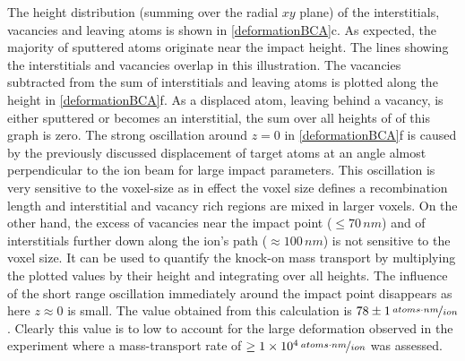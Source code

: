 The height distribution (summing over the radial $xy$ plane) of the interstitials, vacancies and leaving atoms is shown in \ref{deformationBCA}c. As expected, the majority of sputtered atoms originate near the impact height. The lines showing the interstitials and vacancies overlap in this illustration. The vacancies subtracted from the sum of interstitials and leaving atoms is plotted along the height in \ref{deformationBCA}f. As a displaced atom, leaving behind a vacancy, is either sputtered or becomes an interstitial, the sum over all heights of of this graph is zero. The strong oscillation around $z=0$ in \ref{deformationBCA}f is caused by the previously discussed displacement of target atoms at an angle almost perpendicular to the ion beam for large impact parameters. This oscillation is very sensitive to the voxel-size as in effect the voxel size defines a recombination length and interstitial and vacancy rich regions are mixed in larger voxels. On the other hand, the excess of vacancies near the impact point ($\le 70\,nm$) and of interstitials further down along the ion's path ($\approx 100\,nm$) is not sensitive to the voxel size. It can be used to quantify the knock-on mass transport by multiplying the plotted values by their height and integrating over all heights. The influence of the short range oscillation immediately around the impact point disappears as here $z \approx 0$ is small. The value obtained from this calculation is $78\pm1\,\nicefrac{atoms \cdot nm}{ion}$. Clearly this value is to low to account for the large deformation observed in the experiment where a mass-transport rate of $\ge 1\times 10^{4}\,\nicefrac{atoms \cdot nm}{ion}$ was assessed.

